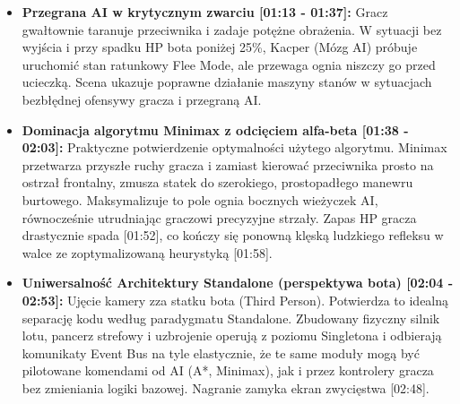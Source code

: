 \documentclass[12pt, a4paper]{article}
\begin{document}
\begin{itemize}
    \item \textbf{Przegrana AI w krytycznym zwarciu [01:13 - 01:37]:} Gracz gwałtownie taranuje przeciwnika i zadaje potężne obrażenia. W sytuacji bez wyjścia i przy spadku HP bota poniżej 25\%, Kacper (Mózg AI) próbuje uruchomić stan ratunkowy Flee Mode, ale przewaga ognia niszczy go przed ucieczką. Scena ukazuje poprawne działanie maszyny stanów w sytuacjach bezbłędnej ofensywy gracza i przegraną AI.
    
    \item \textbf{Dominacja algorytmu Minimax z odcięciem alfa-beta [01:38 - 02:03]:} Praktyczne potwierdzenie optymalności użytego algorytmu. Minimax przetwarza przyszłe ruchy gracza i zamiast kierować przeciwnika prosto na ostrzał frontalny, zmusza statek do szerokiego, prostopadłego manewru burtowego. Maksymalizuje to pole ognia bocznych wieżyczek AI, równocześnie utrudniając graczowi precyzyjne strzały. Zapas HP gracza drastycznie spada [01:52], co kończy się ponowną klęską ludzkiego refleksu w walce ze zoptymalizowaną heurystyką [01:58].
    
    \item \textbf{Uniwersalność Architektury Standalone (perspektywa bota) [02:04 - 02:53]:} Ujęcie kamery zza statku bota (Third Person). Potwierdza to idealną separację kodu według paradygmatu Standalone. Zbudowany fizyczny silnik lotu, pancerz strefowy i uzbrojenie operują z poziomu Singletona i odbierają komunikaty Event Bus na tyle elastycznie, że te same moduły mogą być pilotowane komendami od AI (A*, Minimax), jak i przez kontrolery gracza bez zmieniania logiki bazowej. Nagranie zamyka ekran zwycięstwa [02:48].
\end{itemize}
\end{document}
